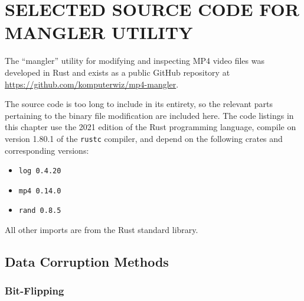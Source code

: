 %
%
%
%
%


\chapter{\uppercase{Selected Source Code for Mangler Utility}}
\label{cha:mangler-source-code}

The ``mangler'' utility for modifying and inspecting MP4 video files was developed in Rust and exists as a public GitHub repository at \url{https://github.com/komputerwiz/mp4-mangler}.

The source code is too long to include in its entirety, so the relevant parts pertaining to the binary file modification are included here. The code listings in this chapter use the 2021 edition of the Rust programming language, compile on version 1.80.1 of the \texttt{rustc} compiler, and depend on the following crates and corresponding versions:
\begin{itemize}
    \item \texttt{log 0.4.20}
    \item \texttt{mp4 0.14.0}
    \item \texttt{rand 0.8.5}
\end{itemize}
All other imports are from the Rust standard library.

\newpage

\section{Data Corruption Methods}

\subsection{Bit-Flipping}

